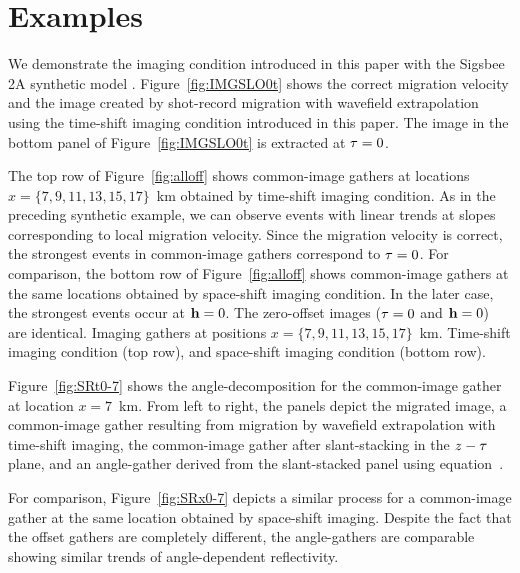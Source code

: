 \section{Examples}
We demonstrate the imaging condition introduced in this paper
with the Sigsbee 2A synthetic model \cite[]{SEG-2002-21222125}.
Figure~\ref{fig:IMGSLO0t} shows the correct migration velocity 
and the image created by shot-record migration 
with wavefield extrapolation using the time-shift 
imaging condition introduced in this paper. 
The image in the bottom panel of 
Figure~\ref{fig:IMGSLO0t} is extracted at $\tt=0$.

The top row of Figure~\ref{fig:alloff} shows common-image gathers at 
locations $x=\{7,9,11,13,15,17\}$~km
obtained by time-shift imaging condition. 
As in the preceding synthetic 
example, we can observe events with linear trends at slopes 
corresponding to local migration velocity.
Since the migration velocity is correct, the strongest 
events in common-image gathers correspond to $\tt=0$.
For comparison, 
the bottom row of Figure~\ref{fig:alloff} shows
common-image gathers at the same locations
obtained by space-shift imaging condition.
In the later case, the strongest events occur at $\hh=0$.
The zero-offset images ($\tt=0$ and $\hh=0$) are identical.
{Imaging gathers at positions $x=\{7,9,11,13,15,17\}$~km.
Time-shift imaging condition (top row), and
space-shift imaging condition (bottom row).}

Figure~\ref{fig:SRt0-7} shows the angle-decomposition
for the common-image gather at location $x=7$~km.
From left to right, the panels depict
the migrated image,
a common-image gather resulting from
migration by wavefield extrapolation with time-shift imaging,
the common-image gather after slant-stacking
in the $z-\tt$ plane, and an angle-gather
derived from the slant-stacked panel using equation~.

For comparison, Figure~\ref{fig:SRx0-7} depicts
a similar process for a common-image gather at the same location
obtained by space-shift imaging.
Despite the fact that the offset gathers are completely 
different, the angle-gathers are comparable showing similar 
trends of angle-dependent reflectivity.

